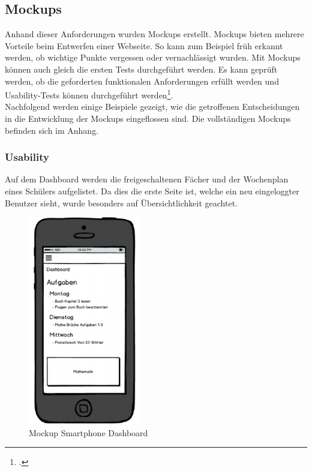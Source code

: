 \subsection{Mockups}
Anhand dieser Anforderungen wurden Mockups erstellt. Mockups bieten mehrere Vorteile beim Entwerfen einer Webseite. So kann zum Beispiel früh erkannt werden, ob wichtige Punkte vergessen oder vernachlässigt wurden. Mit Mockups können auch gleich die ersten Tests durchgeführt werden. Es kann geprüft werden, ob die geforderten funktionalen Anforderungen erfüllt werden und Usability-Tests können durchgeführt werden\footcite{mockups}. \\

Nachfolgend werden einige Beispiele gezeigt, wie die getroffenen Entscheidungen in die Entwicklung der Mockups eingeflossen sind. Die vollständigen Mockups befinden sich im Anhang.

\subsubsection*{Usability}
Auf dem Dashboard werden die freigeschaltenen Fächer und der Wochenplan eines Schülers aufgelistet. Da dies die erste Seite ist, welche ein neu eingeloggter Benutzer sieht, wurde besonders auf Übersichtlichkeit geachtet. \\

\begin{minipage}{\textwidth}
	\begin{figure}[H]
	\centering
		\includegraphics[width=5cm, keepaspectratio]{images/Mockups/Dashboard_Smartphone.png}
		\caption{Mockup Smartphone Dashboard}
	\end{figure}
\end{minipage}


